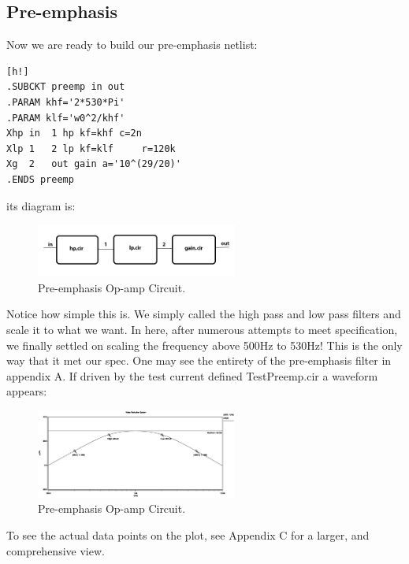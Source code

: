 \documentclass[report]{IEEEtran}
\begin{document}
	\subsection{Pre-emphasis}
		Now we are ready to build our pre-emphasis netlist:
		\begin{center}
		\begin{lstlisting}[caption=Pre-emphasis netlist.][h!]
.SUBCKT preemp in out
.PARAM khf='2*530*Pi'
.PARAM klf='w0^2/khf'
Xhp	in	1 hp kf=khf	c=2n
Xlp	1	2 lp kf=klf 	r=120k
Xg	2	out gain a='10^(29/20)'
.ENDS preemp
		\end{lstlisting}
		\end{center}
		its diagram is:
		\begin{figure}[h!]
			\label{preemp.cir}
			\includegraphics[width=250px]{preemp-sim.jpg}
			\caption{Pre-emphasis Op-amp Circuit.}
		\end{figure}
		Notice how simple this is. We simply called the high pass and low pass filters and scale it to what we want. In here, after numerous attempts to meet specification, we finally settled on scaling the frequency above 500Hz to 530Hz! This is the only way that it met our spec. One may see the entirety of the pre-emphasis filter in appendix A.
		\linebreak
		\linebreak
		If driven by the test current defined TestPreemp.cir a waveform appears:
		\begin{figure}[h!]
			\label{preemp-plot.cir}
			\includegraphics[width=250px]{preemp_plot.eps}
			\caption{Pre-emphasis Op-amp Circuit.}
		\end{figure}
		
		To see the actual data points on the plot, see Appendix C for a larger, and comprehensive view.
\end{document}
